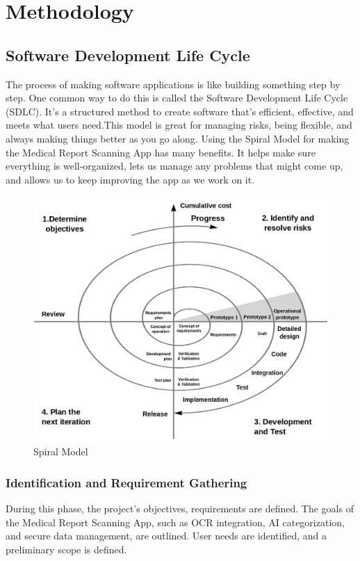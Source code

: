 \chapter{Methodology}\label{ch:methodology}

\section{Software Development Life Cycle}
The process of making software applications is like building something step by step. One common way to do this is called the Software Development Life Cycle (SDLC). It's a structured method to create software that's efficient, effective, and meets what users need.This model is great for managing risks, being flexible, and always making things better as you go along. Using the Spiral Model for making the Medical Report Scanning App has many benefits. It helps make sure everything is well-organized, lets us manage any problems that might come up, and allows us to keep improving the app as we work on it.

\begin{figure}[h]
    \centering
    \includegraphics[width =150mm]{figures/spiral_model.png}
    \caption{Spiral Model}
\end{figure}

\subsection*{Identification and Requirement Gathering}
During this phase, the project's objectives, requirements are defined. The goals of the Medical Report Scanning  App, such as OCR integration, AI categorization, and secure data management, are outlined. User needs are identified, and a preliminary scope is defined.
